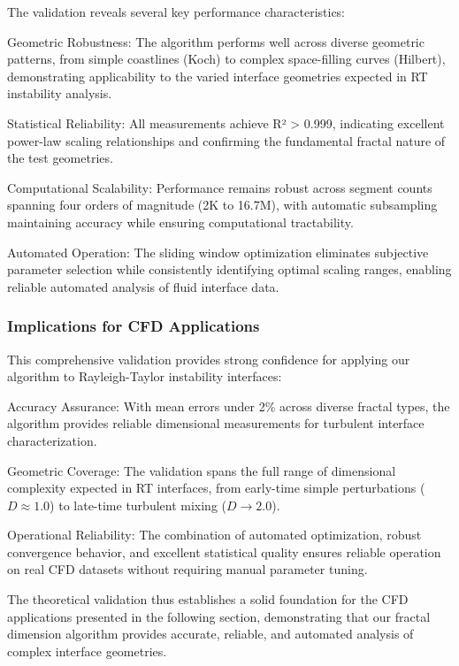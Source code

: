 \documentclass[preprint,12pt]{elsarticle}
\def\textbf#1{#1}%
\begin{document}
The validation reveals several key performance characteristics:

\textbf{Geometric Robustness}: The algorithm performs well across diverse geometric patterns, from simple coastlines (Koch) to complex space-filling curves (Hilbert), demonstrating applicability to the varied interface geometries expected in RT instability analysis.

\textbf{Statistical Reliability}: All measurements achieve R² > 0.999, indicating excellent power-law scaling relationships and confirming the fundamental fractal nature of the test geometries.

\textbf{Computational Scalability}: Performance remains robust across segment counts spanning four orders of magnitude (2K to 16.7M), with automatic subsampling maintaining accuracy while ensuring computational tractability.

\textbf{Automated Operation}: The sliding window optimization eliminates subjective parameter selection while consistently identifying optimal scaling ranges, enabling reliable automated analysis of fluid interface data.

\subsubsection{Implications for CFD Applications}

This comprehensive validation provides strong confidence for applying our algorithm to Rayleigh-Taylor instability interfaces:

\textbf{Accuracy Assurance}: With mean errors under 2\% across diverse fractal types, the algorithm provides reliable dimensional measurements for turbulent interface characterization.

\textbf{Geometric Coverage}: The validation spans the full range of dimensional complexity expected in RT interfaces, from early-time simple perturbations ($D \approx 1.0$) to late-time turbulent mixing ($D \rightarrow 2.0$).

\textbf{Operational Reliability}: The combination of automated optimization, robust convergence behavior, and excellent statistical quality ensures reliable operation on real CFD datasets without requiring manual parameter tuning.

The theoretical validation thus establishes a solid foundation for the CFD applications presented in the following section, demonstrating that our fractal dimension algorithm provides accurate, reliable, and automated analysis of complex interface geometries.
\end{document}
